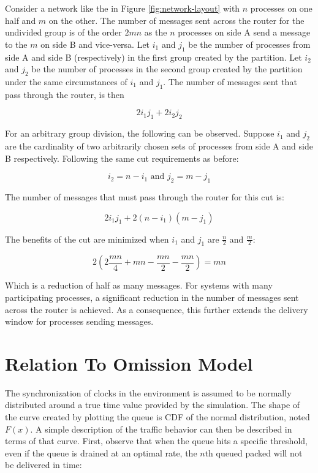 Consider a network like the in Figure \ref{fig:network-layout} with $n$ processes on one half and $m$ on the other.
The number of messages sent across the router for the undivided group is of the order $2mn$ as the $n$ processes on side A send a message to the $m$ on side B and vice-versa.
Let $i_{1}$ and $j_{1}$ be the number of processes from side A and side B (respectively) in the first group created by the partition.
Let $i_{2}$ and $j_{2}$ be the number of processes in the second group created by the partition under the same circumstances of $i_1$ and $j_1$.
The number of messages sent that pass through the router, is then 

\begin{equation}
2 i_{1} j_{1} + 2 i_{2} j_{2}
\end{equation}

For an arbitrary group division, the following can be observed.
Suppose $i_{1}$ and $j_{2}$ are the cardinality of two arbitrarily chosen sets of processes from side A and side B respectively.
Following the same cut requirements as before:

\begin{equation}
i_2 = n - i_1 \text{ and } j_2 = m - j_1
\end{equation}

The number of messages that must pass through the router for this cut is:

\begin{equation}
2 i_{1} j_{1} + 2 (n-i_{1}) (m-j_{1})
\end{equation}

The benefits of the cut are minimized when $i_1$ and $j_1$ are $\frac{n}{2}$ and $\frac{m}{2}$:

\begin{equation}
2( 2 \frac{mn}{4} + mn - \frac{mn}{2} - \frac{mn}{2}) = mn
\end{equation}

Which is a reduction of half as many messages.
For systems with many participating processes, a significant reduction in the number of messages sent across the router is achieved.
As a consequence, this further extends the delivery window for processes sending messages.

\section{Relation To Omission Model}

The synchronization of clocks in the environment is assumed to be normally distributed around a true time value provided by the simulation.
The shape of the curve created by plotting the queue is \ac{CDF} of the normal distribution, noted $F(x)$.
A simple description of the traffic behavior can then be described in terms of that curve.
First, observe that when the queue hits a specific threshold, even if the queue is drained at an optimal rate, the $n$th queued packed will not be delivered in time:

